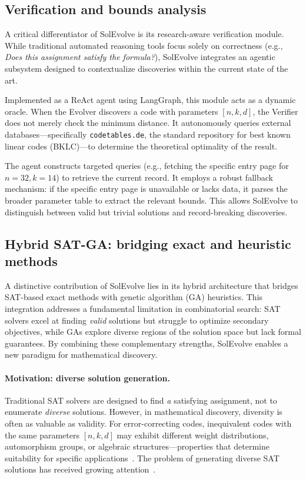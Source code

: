 \subsection{Verification and bounds analysis}
A critical differentiator of SolEvolve is its research-aware verification module. While traditional automated reasoning tools focus solely on correctness (e.g., \textit{Does this assignment satisfy the formula?}), SolEvolve integrates an agentic subsystem designed to contextualize discoveries within the current state of the art.

Implemented as a ReAct agent using LangGraph, this module acts as a dynamic oracle. When the Evolver discovers a code with parameters $[n,k,d]$, the Verifier does not merely check the minimum distance. It autonomously queries external databases—specifically \texttt{codetables.de}, the standard repository for best known linear codes (BKLC)—to determine the theoretical optimality of the result.

The agent constructs targeted queries (e.g., fetching the specific entry page for $n=32, k=14$) to retrieve the current record. It employs a robust fallback mechanism: if the specific entry page is unavailable or lacks data, it parses the broader parameter table to extract the relevant bounds. This allows SolEvolve to distinguish between valid but trivial solutions and record-breaking discoveries.

\subsection{Hybrid SAT-GA: bridging exact and heuristic methods}\label{sec:hybrid}

A distinctive contribution of SolEvolve lies in its hybrid architecture that bridges SAT-based exact methods with genetic algorithm (GA) heuristics. This integration addresses a fundamental limitation in combinatorial search: SAT solvers excel at finding \textit{valid} solutions but struggle to optimize secondary objectives, while GAs explore diverse regions of the solution space but lack formal guarantees. By combining these complementary strengths, SolEvolve enables a new paradigm for mathematical discovery.

\paragraph{Motivation: diverse solution generation.} Traditional SAT solvers are designed to find \textit{a} satisfying assignment, not to enumerate \textit{diverse} solutions. However, in mathematical discovery, diversity is often as valuable as validity. For error-correcting codes, inequivalent codes with the same parameters $[n,k,d]$ may exhibit different weight distributions, automorphism groups, or algebraic structures---properties that determine suitability for specific applications~\cite{Nadler2011DiverseSAT}. The problem of generating diverse SAT solutions has received growing attention~\cite{Eifler2024DiverseSAT}.

